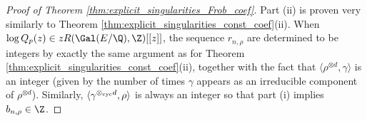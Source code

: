\documentclass[12pt]{amsart}
\theoremstyle{plain}
\begin{document}
\begin{proof}[Proof of Theorem \ref{thm:explicit_singularities_Frob_coef}]
    Part (ii) is proven very similarly to Theorem \ref{thm:explicit_singularities_const_coef}(ii). When $\log Q_p(z) \in zR(\Gal(E/\Q),\Z)[[z]]$, the sequence $r_{n,\rho}$ are determined to be integers by exactly the same argument as for Theorem \ref{thm:explicit_singularities_const_coef}(ii), together with the fact that $\langle \rho^{\otimes d},\gamma\rangle$ is an integer (given by the number of times $\gamma$ appears as an irreducible component of $\rho^{\otimes d}$). Similarly, $\langle \gamma^{\otimes_{\rm cyc} d},\rho\rangle$ is always an integer so that part (i) implies $b_{n,\rho}\in \Z$.
\end{proof}
























%

\end{document}

